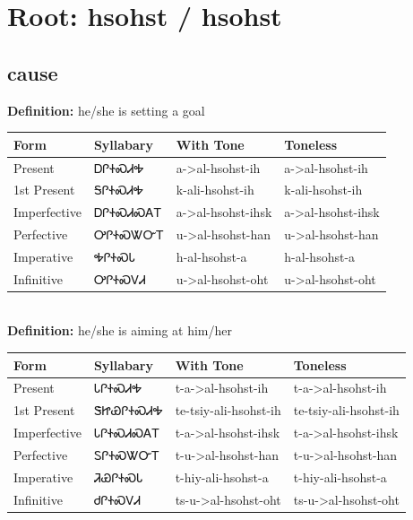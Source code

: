 \documentclass{article}%
\begin{document}
%
\normalsize%
\section*{Root: hsohst / hsohst}%
\subsection*{cause}%
\textbf{Definition: }%
he/she is setting a goal%
\\[0.5em]%
\begin{tabular}{|l|l|l|l|}%
\hline%
\textbf{Form}&\textbf{Syllabary}&\textbf{With Tone}&\textbf{Toneless}\\%
\hline%
Present&ᎠᎵᏐᏍᏗᎭ&a{-}>al{-}hsohst{-}ih&a{-}>al{-}hsohst{-}ih\\%
1st Present&ᎦᎵᏐᏍᏗᎭ&k{-}ali{-}hsohst{-}ih&k{-}ali{-}hsohst{-}ih\\%
Imperfective&ᎠᎵᏐᏍᏗᏍᎪᎢ&a{-}>al{-}hsohst{-}ihsk&a{-}>al{-}hsohst{-}ihsk\\%
Perfective&ᎤᎵᏐᏍᏔᏅᎢ&u{-}>al{-}hsohst{-}han&u{-}>al{-}hsohst{-}han\\%
Imperative&ᎭᎵᏐᏍᏓ&h{-}al{-}hsohst{-}a&h{-}al{-}hsohst{-}a\\%
Infinitive&ᎤᎵᏐᏍᏙᏗ&u{-}>al{-}hsohst{-}oht&u{-}>al{-}hsohst{-}oht\\%
\hline%
\end{tabular}%
\\[1em]%
\textbf{Definition: }%
he/she is aiming at him/her%
\\[0.5em]%
\begin{tabular}{|l|l|l|l|}%
\hline%
\textbf{Form}&\textbf{Syllabary}&\textbf{With Tone}&\textbf{Toneless}\\%
\hline%
Present&ᏓᎵᏐᏍᏗᎭ&t{-}a{-}>al{-}hsohst{-}ih&t{-}a{-}>al{-}hsohst{-}ih\\%
1st Present&ᏕᏥᏯᎵᏐᏍᏗᎭ&te{-}tsiy{-}ali{-}hsohst{-}ih&te{-}tsiy{-}ali{-}hsohst{-}ih\\%
Imperfective&ᏓᎵᏐᏍᏗᏍᎪᎢ&t{-}a{-}>al{-}hsohst{-}ihsk&t{-}a{-}>al{-}hsohst{-}ihsk\\%
Perfective&ᏚᎵᏐᏍᏔᏅᎢ&t{-}u{-}>al{-}hsohst{-}han&t{-}u{-}>al{-}hsohst{-}han\\%
Imperative&ᏘᏯᎵᏐᏍᏓ&t{-}hiy{-}ali{-}hsohst{-}a&t{-}hiy{-}ali{-}hsohst{-}a\\%
Infinitive&ᏧᎵᏐᏍᏙᏗ&ts{-}u{-}>al{-}hsohst{-}oht&ts{-}u{-}>al{-}hsohst{-}oht\\%
\hline%
\end{tabular}%
\\[1em]%
\end{document}
